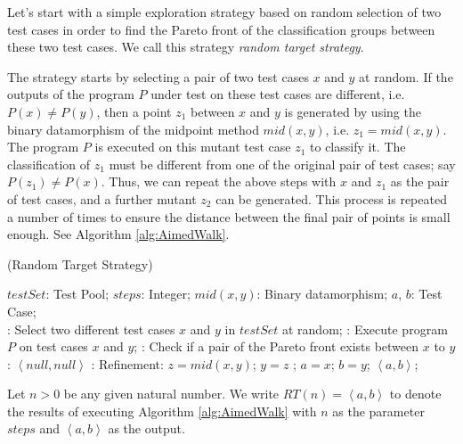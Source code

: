 \documentclass[preprint,1p,authoryear,times]{elsarticle}
\begin{document}
Let's start with a simple exploration strategy based on random selection of two test cases in order to find the Pareto front of the classification groups between these two test cases. We call this strategy \emph{random target strategy}.  

The strategy starts by selecting a pair of two test cases $x$ and $y$ at random. If the outputs of the program $P$ under test on these test cases are different, i.e. $P(x) \neq P(y)$, then a point $z_1$ between $x$ and $y$ is generated by using the binary datamorphism of the midpoint method $mid(x,y)$, i.e. $z_1 = mid(x,y)$. The program $P$ is executed on this mutant test case $z_1$ to classify it. The classification of $z_1$ must be different from one of the original pair of test cases; say $P(z_1) \neq P(x)$. Thus, we can repeat the above steps with $x$ and $z_1$ as the pair of test cases, and a further mutant $z_2$ can be generated. This process is repeated a number of times to ensure the distance between the final pair of points is small enough. See Algorithm \ref{alg:AimedWalk}. 

\begin{algorithm}[h] 
\caption{(Random Target Strategy)}\label{alg:AimedWalk}
\begin{small}
\begin{algorithmic}
\Require 
        $testSet$: Test Pool; 
        $steps$: Integer; 
        $mid(x,y)$: Binary datamorphism; 
\Ensure  
        $a$, $b$: Test Case; \\
: Select two different test cases $x$ and $y$ in $testSet$ at random; 
: Execute program $P$ on test cases $x$ and $y$;
: Check if a pair of the Pareto front exists between $x$ to $y$:
 \Return $\left< null, null \right>$ \EndIf
{}: Refinement:
	\State $z = mid(x,y)$;
	 { $y=z$}
	\EndIf
\EndFor ;
\State $a = x$;  $b = y$; 
\State \Return $\left< a, b \right>$;  \\
\end{algorithmic}
\end{small}
\end{algorithm}

Let $n>0$ be any given natural number. We write $RT(n)=\left< a,b \right>$ to denote the results of executing Algorithm \ref{alg:AimedWalk} with $n$ as the parameter $steps$ and $\left< a, b \right>$ as the output. 
\end{document}
